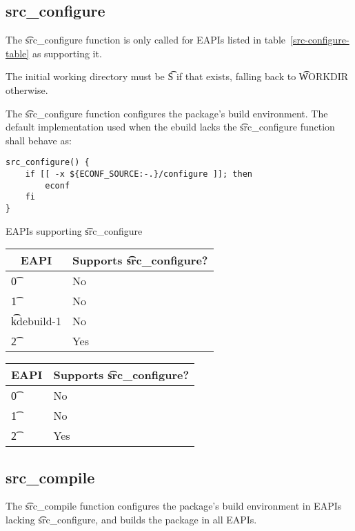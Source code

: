 \subsection{src\_configure}
\label{src-configure-function}

The \t{src\_configure} function is only called for EAPIs listed in table~\ref{src-configure-table} as
supporting it.

The initial working directory must be \t{S} if that exists, falling back to \t{WORKDIR} otherwise.

The \t{src\_configure} function configures the package's build environment. The default
implementation used when the ebuild lacks the \t{src\_configure} function shall behave as:

\begin{verbatim}
src_configure() {
    if [[ -x ${ECONF_SOURCE:-.}/configure ]]; then
        econf
    fi
}
\end{verbatim}

\begin{centertable}{EAPIs supporting \t{src\_configure}} \label{src-configure-table}
\IFKDEBUILDELSE
{
    \begin{tabular}{ l l }
        \toprule
        \multicolumn{1}{c}{\textbf{EAPI}} &
        \multicolumn{1}{c}{\textbf{Supports \t{src\_configure}?}} \\
        \midrule
    \t{0} & No \\
    \t{1} & No \\
    \t{kdebuild-1} & No \\
    \t{2} & Yes \\
    \bottomrule
    \end{tabular}
}{
    \begin{tabular}{ l l }
        \toprule
        \multicolumn{1}{c}{\textbf{EAPI}} &
        \multicolumn{1}{c}{\textbf{Supports \t{src\_configure}?}} \\
        \midrule
    \t{0} & No \\
    \t{1} & No \\
    \t{2} & Yes \\
    \bottomrule
    \end{tabular}
}
\end{centertable}

\subsection{src\_compile}
\label{src-compile-function}

The \t{src\_compile} function configures the package's build environment in EAPIs lacking
\t{src\_configure}, and builds the package in all EAPIs.

